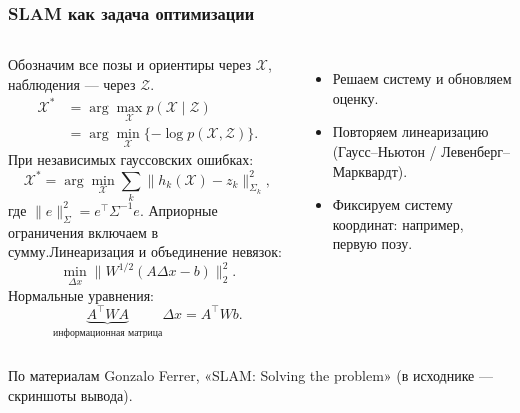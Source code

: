 \documentclass[aspectratio=169,xcolor=dvipsnames]{beamer}
\newcommand{\source}[1]{\par\vfill{\fontsize{6}{7}\selectfont\color{gray}#1\par}}
\begin{document}
\begin{frame}
\frametitle{SLAM как задача оптимизации}
\fontsize{9}{10.5}\selectfont \begin{columns}[c]Обозначим все позы и ориентиры через $\mathcal X$, наблюдения — через $\mathcal Z$.
\[
\begin{aligned}
\mathcal X^*&=\arg\max_{\mathcal X}p(\mathcal X\mid\mathcal Z)\\
&=\arg\min_{\mathcal X}\{-\log p(\mathcal X,\mathcal Z)\}.
\end{aligned}
\]
При независимых гауссовских ошибках:
\[\mathcal X^*=\arg\min_{\mathcal X}\sum_k\|h_k(\mathcal X)-z_k\|_{\Sigma_k}^2,\]
где $\|e\|_{\Sigma}^2=e^\top\Sigma^{-1}e$. Априорные ограничения включаем в сумму.\centering Линеаризация и объединение невязок:
\[\min_{\Delta x}\|W^{1/2}(A\Delta x-b)\|_2^2.\]
Нормальные уравнения:
\[\underbrace{A^\top W A}_{\text{информационная матрица}}\Delta x=A^\top Wb.\]
\begin{itemize}
\item Решаем систему и обновляем оценку.
\item Повторяем линеаризацию (Гаусс--Ньютон / Левенберг--Марквардт).
\item Фиксируем систему координат: например, первую позу.
\end{itemize}\end{columns}\source{По материалам Gonzalo Ferrer, «SLAM: Solving the problem» (в исходнике — скриншоты вывода).}
\end{frame}
\end{document}
